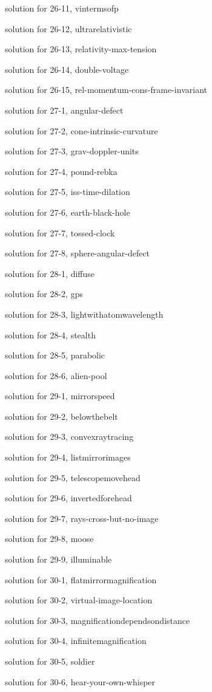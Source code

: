 \documentclass{problems}
\begin{document}
solution for 26-11, vintermsofp

solution for 26-12, ultrarelativistic

solution for 26-13, relativity-max-tension

solution for 26-14, double-voltage

solution for 26-15, rel-momentum-cons-frame-invariant

solution for 27-1, angular-defect

solution for 27-2, cone-intrinsic-curvature

solution for 27-3, grav-doppler-units

solution for 27-4, pound-rebka

solution for 27-5, iss-time-dilation

solution for 27-6, earth-black-hole

solution for 27-7, tossed-clock

solution for 27-8, sphere-angular-defect

solution for 28-1, diffuse

solution for 28-2, gps

solution for 28-3, lightwithatomwavelength

solution for 28-4, stealth

solution for 28-5, parabolic

solution for 28-6, alien-pool

solution for 29-1, mirrorspeed

solution for 29-2, belowthebelt

solution for 29-3, convexraytracing

solution for 29-4, listmirrorimages

solution for 29-5, telescopemovehead

solution for 29-6, invertedforehead

solution for 29-7, rays-cross-but-no-image

solution for 29-8, moose

solution for 29-9, illuminable

solution for 30-1, flatmirrormagnification

solution for 30-2, virtual-image-location

solution for 30-3, magnificationdependsondistance

solution for 30-4, infinitemagnification

solution for 30-5, soldier

solution for 30-6, hear-your-own-whisper
\end{document}
